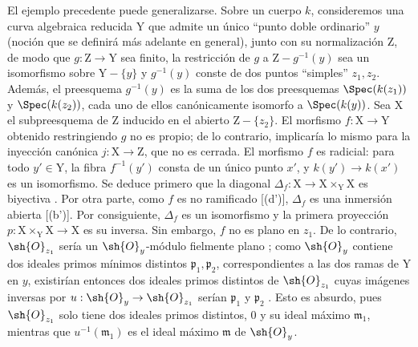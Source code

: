 \begin{env}[11.7.3]
\label{IV.11.7.3}
El ejemplo precedente puede generalizarse. Sobre un cuerpo $k$, consideremos una curva algebraica reducida $\mathrm{Y}$ que admite un único ``punto doble ordinario'' $y$ (noción que se definirá más adelante en general), junto con su normalización $\mathrm{Z}$, de modo que $g:\mathrm{Z}\to\mathrm{Y}$ sea finito, la restricción de $g$ a $\mathrm{Z}-g^{-1}(y)$ sea un isomorfismo sobre $\mathrm{Y}-\{y\}$ y $g^{-1}(y)$ conste de dos puntos ``simples'' $z_1,z_2$. Además, el preesquema $g^{-1}(y)$ es la suma de los dos preesquemas $\Spec(k(z_1))$ y $\Spec(k(z_2))$, cada uno de ellos canónicamente isomorfo a $\Spec(k(y))$.
Sea $\mathrm{X}$ el subpreesquema de $\mathrm{Z}$ inducido en el abierto $\mathrm{Z}-\{z_2\}$. El morfismo $f:\mathrm{X}\to\mathrm{Y}$ obtenido restringiendo $g$ no es propio; de lo contrario,  implicaría lo mismo para la inyección canónica $j:\mathrm{X}\to\mathrm{Z}$, que no es cerrada.
El morfismo $f$ es radicial: para todo $y'\in\mathrm{Y}$, la fibra $f^{-1}(y')$ consta de un único punto $x'$, y $k(y')\to k(x')$ es un isomorfismo. Se deduce primero que la diagonal $\Delta_f:\mathrm{X}\to\mathrm{X}\times_\mathrm{Y}\mathrm{X}$ es biyectiva . Por otra parte, como $f$ es no ramificado [(d')], $\Delta_f$ es una inmersión abierta [(b')]. Por consiguiente, $\Delta_f$ es un isomorfismo y la primera proyección $p:\mathrm{X}\times_\mathrm{Y}\mathrm{X}\to\mathrm{X}$ es su inversa.
Sin embargo, $f$ no es plano en $z_1$. De lo contrario, $\sh{O}_{z_1}$ sería un $\sh{O}_y$-módulo fielmente plano ; como $\sh{O}_y$ contiene dos ideales primos mínimos distintos $\mathfrak{p}_1,\mathfrak{p}_2$, correspondientes a las dos ramas de $\mathrm{Y}$ en $y$, existirían entonces dos ideales primos distintos de $\sh{O}_{z_1}$ cuyas imágenes inversas por $u:\sh{O}_y\to\sh{O}_{z_1}$ serían $\mathfrak{p}_1$ y $\mathfrak{p}_2$ . Esto es absurdo, pues $\sh{O}_{z_1}$ solo tiene dos ideales primos distintos, $0$ y su ideal máximo $\mathfrak{m}_1$, mientras que $u^{-1}(\mathfrak{m}_1)$ es el ideal máximo $\mathfrak{m}$ de $\sh{O}_y$.
\end{env}

